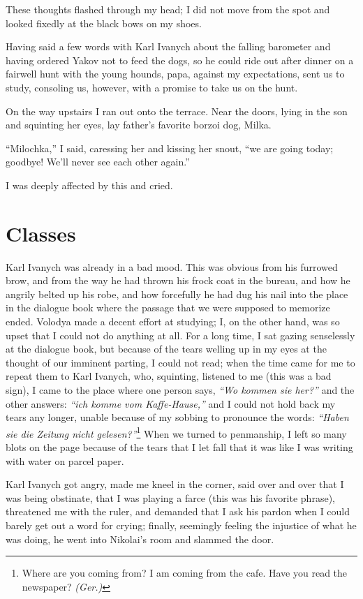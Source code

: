 These thoughts flashed through my head; I did not move from the spot and looked fixedly at the black bows on my shoes.

Having said a few words with Karl Ivanych about the falling barometer and having ordered Yakov not to feed the dogs, so he could ride out after dinner on a fairwell hunt with the young hounds, papa, against my expectations, sent us to study, consoling us, however, with a promise to take us on the hunt.

On the way upstairs I ran out onto the terrace. Near the doors, lying in the son and squinting her eyes, lay father's favorite borzoi dog, Milka.

``Milochka,'' I said, caressing her and kissing her snout, ``we are going today; goodbye! We'll never see each other again.'' %

I was deeply affected by this and cried.

\chapter{Classes}

Karl Ivanych was already in a bad mood. This was obvious from his furrowed brow, and from the way he had thrown his frock coat in the bureau,  and how he angrily belted up his robe, and how forcefully he had dug his nail into the place in the dialogue book where the passage that we were supposed to memorize ended. Volodya made a decent effort at studying; I, on the other hand, was so upset that I could not do anything at all. For a long time, I sat gazing senselessly at the dialogue book, but because of the tears welling up in my eyes at the thought of our imminent parting, I could not read; when the time came for me to repeat them to Karl Ivanych, who, squinting, listened to me (this was a bad sign), I came to the place where one person says, \textit{``Wo kommen sie her?''} and the other answers: \textit{``ich komme vom Kaffe-Hause,''} and I could not hold back my tears any longer, unable because of my sobbing to pronounce the words: \textit{``Haben sie die Zeitung nicht gelesen?''}\footnote{Where are you coming from? I am coming from the cafe. Have you read the newspaper? \textit{(Ger.)}} When we turned to penmanship, I left so many blots on the page because of the tears that I let fall that it was like I was writing with water on parcel paper.

Karl Ivanych got angry, made me kneel in the corner, said over and over that I was being obstinate, that I was playing a farce (this was his favorite phrase), threatened me with the ruler, and demanded that I ask his pardon when I could barely get out a word for crying; finally, seemingly feeling the injustice of what he was doing, he went into Nikolai's room and slammed the door.


